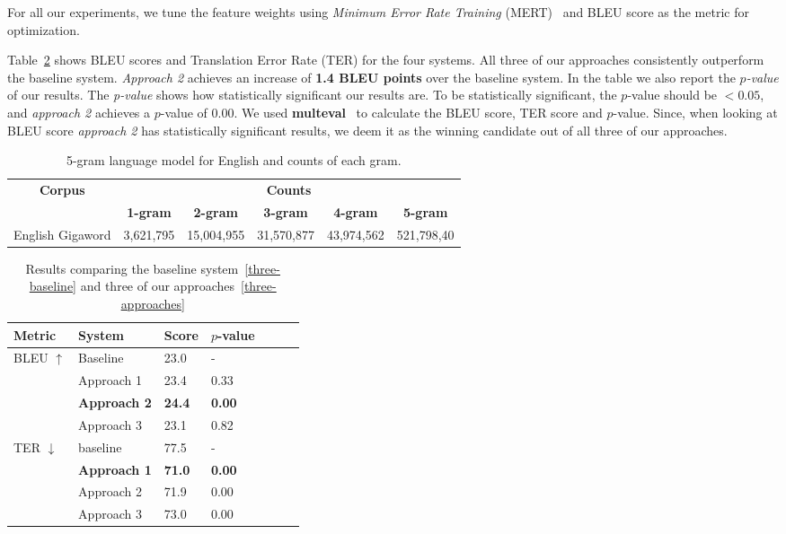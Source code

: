 For all our experiments, we tune the feature weights using \textit{Minimum Error Rate Training} (MERT)~\cite{Och2003} and BLEU score as the metric for optimization.

Table~\ref{table:results} shows BLEU scores and Translation Error Rate (TER) for the four systems. All three of our approaches consistently outperform the baseline system. \textit{Approach 2} achieves an increase of \textbf{1.4 BLEU points} over the baseline system. In the table we also report the \textit{$p$-value} of our results. The \textit{p-value} shows how statistically significant our results are. To be statistically significant, the $p$-value should be $< 0.05$, and \textit{approach 2} achieves a $p$-value of $0.00$. We used \textbf{multeval}~\cite{multeval} to calculate the BLEU score, TER score and $p$-value. Since, when looking at BLEU score \textit{approach 2} has statistically significant results, we deem it as the winning candidate out of all three of our approaches.

\begin{table}
	\begin{center}
		\begin{tabular}{|c|c|c|c|c|c|}
			\hline
			\textbf{Corpus} & \multicolumn{5}{c|}{\textbf{Counts}} \\
			\cline{2-6}
			 & \textbf{1-gram} & \textbf{2-gram} & \textbf{3-gram} & \textbf{4-gram} & \textbf{5-gram}\\\hline
			English Gigaword & 3,621,795 & 15,004,955 & 31,570,877 & 43,974,562 & 521,798,40\\\hline
		\end{tabular}
		\caption{5-gram language model for English and counts of each gram.}
		\label{table:language-model-statistics}		
	\end{center}
\end{table}

\begin{table}[htb]
	\begin{center}
			\begin{tabular}{|l|l|l|l|l|l|l|}
				\hline
				\bf Metric & \bf System & \bf Score & \bf $p$-value \\
				\hline
				\multirow{4}{*}{BLEU $\uparrow$}
				& Baseline & 23.0 & - \\
				& Approach 1 & 23.4  & 0.33 \\
				& \textbf{Approach 2} & \textbf{24.4} & \textbf{0.00} \\
				& Approach 3 & 23.1 & 0.82 \\
				\hline
				\multirow{4}{*}{TER $\downarrow$}
				& baseline & 77.5 & - \\
				& \textbf{Approach 1} & \textbf{71.0} & \textbf{0.00} \\
				& Approach 2 & 71.9 & 0.00 \\
				& Approach 3 & 73.0 & 0.00 \\
				\hline
			\end{tabular}
			\caption{Results comparing the baseline system~\ref{three-baseline} and three of our approaches~\ref{three-approaches}}
			\label{table:results}
	\end{center}
\end{table}


